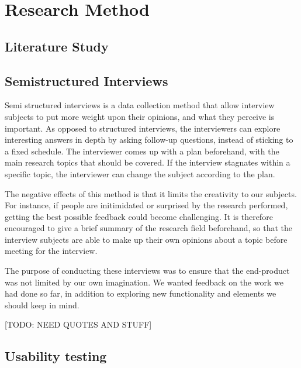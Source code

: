\chapter{Research Method}
\label{sec:researchmethod}


\section{Literature Study}
\label{sec:literaturestudy}

\section{Semistructured Interviews}
\label{sec:semistructuredinterviews}

Semi structured interviews is a data collection method that allow interview subjects to put more weight upon their opinions, and what they perceive is important. As opposed to structured interviews, the interviewers can explore interesting answers in depth by asking follow-up questions, instead of sticking to a fixed schedule. The interviewer comes up with a plan beforehand, with the main research topics that should be covered. If the interview stagnates within a specific topic, the interviewer can change the subject according to the plan.

The negative effects of this method is that it limits the creativity to our subjects. For instance, if people are initimidated or surprised by the research performed, getting the best possible feedback could become challenging. It is therefore encouraged to give a brief summary of the research field beforehand, so that the interview subjects are able to make up their own opinions about a topic before meeting for the interview.   

The purpose of conducting these interviews was to ensure that the end-product was not limited by our own imagination. We wanted feedback on the work we had done so far, in addition to exploring new functionality and elements we should keep in mind.

[TODO: NEED QUOTES AND STUFF]

\section{Usability testing}
\label{sec:usabilitytesting}


